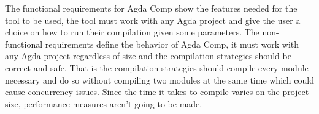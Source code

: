 The functional requirements for Agda Comp show the features needed for the tool
to be used, the tool must work with any Agda project and give the user a choice
on how to run their compilation given some parameters. The non-functional
requirements define the behavior of Agda Comp, it must work with any Agda
project regardless of size and the compilation strategies should be correct and
safe. That is the compilation strategies should compile every module necessary
and do so without compiling two modules at the same time which could cause
concurrency issues. Since the time it takes to compile varies on the project
size, performance measures aren't going to be made.


%

